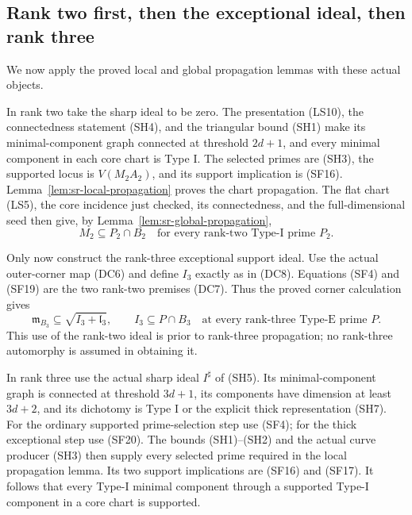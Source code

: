 \subsection{Rank two first, then the exceptional ideal, then rank three}
We now apply the proved local and global
propagation lemmas with these actual objects.

In rank two take the sharp ideal to be zero.
The presentation (LS10), the connectedness
statement (SH4), and the triangular bound (SH1)
make its minimal-component graph connected
at threshold \(2d+1\), and every minimal
component in each core chart is Type I.
The selected primes are (SH3), the supported
locus is \(V(M_2A_2)\), and its support
implication is (SF16).
Lemma~\ref{lem:sr-local-propagation} proves
the chart propagation.
The flat chart (LS5), the core incidence
just checked, its connectedness, and the
full-dimensional seed then give, by
Lemma~\ref{lem:sr-global-propagation},
\[
  M_2\subseteq P_2\cap B_2
                \quad\text{for every rank-two Type-I prime }P_2.
                                                               \tag{SF19}
\]

Only now construct the rank-three exceptional
support ideal.
Use the actual outer-corner map (DC6) and
define \(I_3\) exactly as in (DC8).
Equations (SF4) and (SF19) are the two
rank-two premises (DC7).
Thus the proved corner calculation gives
\[
 \mathfrak m_{B_3}\subseteq\sqrt{I_3+\mathfrak l_3},
 \qquad
 I_3\subseteq P\cap B_3
                  \quad\text{at every rank-three Type-E prime }P .
                                                               \tag{SF20}
\]
This use of the rank-two ideal is prior to
rank-three propagation; no rank-three
automorphy is assumed in obtaining it.

In rank three use the actual sharp ideal
\(I^\sharp\) of (SH5).
Its minimal-component graph is connected
at threshold \(3d+1\), its components have
dimension at least \(3d+2\), and its
dichotomy is Type I or the explicit thick
representation (SH7).
For the ordinary supported prime-selection
step use (SF4); for the thick exceptional
step use (SF20).
The bounds (SH1)--(SH2) and the actual curve
producer (SH3) then supply every selected
prime required in the local propagation
lemma. Its two support implications are
(SF16) and (SF17).
It follows that every Type-I minimal
component through a supported Type-I
component in a core chart is supported.

